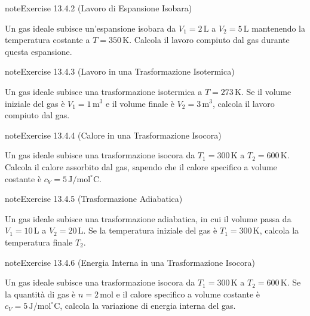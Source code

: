 \documentclass[letterpaper,10pt,italian]{jupyterBook}
\begin{document}
\begin{sphinxadmonition}{note}{Exercise 13.4.2 (Lavoro di Espansione Isobara)}



\sphinxAtStartPar
Un gas ideale subisce un’espansione isobara da \(V_1 = 2 \, \text{L}\) a \(V_2 = 5 \, \text{L}\) mantenendo la temperatura costante a \(T = 350 \, \text{K}\). Calcola il lavoro compiuto dal gas durante questa espansione.
\end{sphinxadmonition}
 \label{exercise:ch/thermodynamics/matter-problems-exercise-2}

\begin{sphinxadmonition}{note}{Exercise 13.4.3 (Lavoro in una Trasformazione Isotermica)}



\sphinxAtStartPar
Un gas ideale subisce una trasformazione isotermica a \(T = 273 \, \text{K}\). Se il volume iniziale del gas è \(V_1 = 1 \, \text{m}^3\) e il volume finale è \(V_2 = 3 \, \text{m}^3\), calcola il lavoro compiuto dal gas.
\end{sphinxadmonition}
 \label{exercise:ch/thermodynamics/matter-problems-exercise-3}

\begin{sphinxadmonition}{note}{Exercise 13.4.4 (Calore in una Trasformazione Isocora)}



\sphinxAtStartPar
Un gas ideale subisce una trasformazione isocora da \(T_1 = 300 \, \text{K}\) a \(T_2 = 600 \, \text{K}\). Calcola il calore assorbito dal gas, sapendo che il calore specifico a volume costante è \(c_V = 5 \, \text{J/mol}^\circ \text{C}\).
\end{sphinxadmonition}
 \label{exercise:ch/thermodynamics/matter-problems-exercise-4}

\begin{sphinxadmonition}{note}{Exercise 13.4.5 (Trasformazione Adiabatica)}



\sphinxAtStartPar
Un gas ideale subisce una trasformazione adiabatica, in cui il volume passa da \(V_1 = 10 \, \text{L}\) a \(V_2 = 20 \, \text{L}\). Se la temperatura iniziale del gas è \(T_1 = 300 \, \text{K}\), calcola la temperatura finale \(T_2\).
\end{sphinxadmonition}
 \label{exercise:ch/thermodynamics/matter-problems-exercise-5}

\begin{sphinxadmonition}{note}{Exercise 13.4.6 (Energia Interna in una Trasformazione Isocora)}



\sphinxAtStartPar
Un gas ideale subisce una trasformazione isocora da \(T_1 = 300 \, \text{K}\) a \(T_2 = 600 \, \text{K}\). Se la quantità di gas è \(n = 2 \, \text{mol}\) e il calore specifico a volume costante è \(c_V = 5 \, \text{J/mol}^\circ \text{C}\), calcola la variazione di energia interna del gas.
\end{sphinxadmonition}
 \label{exercise:ch/thermodynamics/matter-problems-exercise-6}
\end{document}
